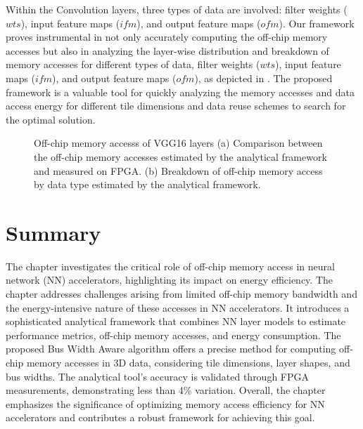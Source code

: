 Within the Convolution layers, three types of data are involved: filter weights ($wts$), input feature maps ($ifm$), and output feature maps ($ofm$). Our framework proves instrumental in not only accurately computing the off-chip memory accesses but also in analyzing the layer-wise distribution and breakdown of memory accesses for different types of data, filter weights ($wts$), input feature maps ($ifm$), and output feature maps ($ofm$), as depicted in . The proposed framework is a valuable tool for quickly analyzing the memory accesses and data access energy for different tile dimensions and data reuse schemes to search for the optimal solution. 
\begin{figure}[!htb]
	\centering
	\captionsetup{font=sf}
	\hfil
	\hfil   
	\caption{Off-chip memory accesss of VGG16 layers (a) Comparison between the off-chip memory accesses estimated by the analytical framework and measured on FPGA. (b) Breakdown of off-chip memory access by data type estimated by the analytical framework.}
	\label{fig:nnLayerData}
\end{figure}
\section{Summary}
The chapter investigates the critical role of off-chip memory access in neural network (NN) accelerators, highlighting its impact on energy efficiency. The chapter addresses challenges arising from limited off-chip memory bandwidth and the energy-intensive nature of these accesses in NN accelerators. It introduces a sophisticated analytical framework that combines NN layer models to estimate performance metrics, off-chip memory accesses, and energy consumption. The proposed Bus Width Aware algorithm offers a precise method for computing off-chip memory accesses in 3D data, considering tile dimensions, layer shapes, and bus widths. The analytical tool's accuracy is validated through FPGA measurements, demonstrating less than 4\% variation. Overall, the chapter emphasizes the significance of optimizing memory access efficiency for NN accelerators and contributes a robust framework for achieving this goal.